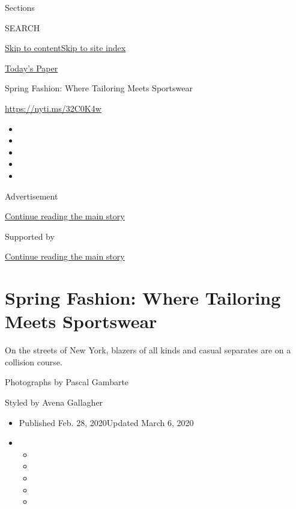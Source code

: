 Sections

SEARCH

\protect\hyperlink{site-content}{Skip to
content}\protect\hyperlink{site-index}{Skip to site index}

\href{https://myaccount.nytimes3xbfgragh.onion/auth/login?response_type=cookie\&client_id=vi}{}

\href{https://www.nytimes3xbfgragh.onion/section/todayspaper}{Today's
Paper}

Spring Fashion: Where Tailoring Meets Sportswear

\url{https://nyti.ms/32C0K4w}

\begin{itemize}
\item
\item
\item
\item
\item
\end{itemize}

Advertisement

\protect\hyperlink{after-top}{Continue reading the main story}

Supported by

\protect\hyperlink{after-sponsor}{Continue reading the main story}

\hypertarget{spring-fashion-where-tailoring-meets-sportswear}{%
\section{Spring Fashion: Where Tailoring Meets
Sportswear}\label{spring-fashion-where-tailoring-meets-sportswear}}

On the streets of New York, blazers of all kinds and casual separates
are on a collision course.

Photographs by Pascal Gambarte

Styled by Avena Gallagher

\begin{itemize}
\item
  Published Feb. 28, 2020Updated March 6, 2020
\item
  \begin{itemize}
  \item
  \item
  \item
  \item
  \item
  \end{itemize}
\end{itemize}

